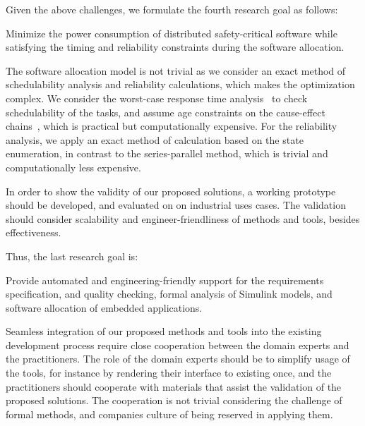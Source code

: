 Given the above challenges, we formulate the fourth research goal as follows:
\begin{researchgoal}
 Minimize the power consumption of distributed safety-critical software while satisfying the timing and reliability constraints during the software allocation.
\end{researchgoal}

The software allocation model is not trivial as we consider an exact method of schedulability analysis and reliability calculations, which makes the optimization complex. We consider the worst-case response time analysis~\cite{Baruah2011Response-timeSystems}\cite{Davis2007ControllerRevised} to check schedulability of the tasks, and assume age constraints on the cause-effect chains~\cite{mubeen2013support}, which is practical but computationally expensive. For the reliability analysis, we apply an exact method of calculation based on the state enumeration, in contrast to the series-parallel method, which is trivial and computationally less expensive. 

In order to show the validity of our proposed solutions, a working prototype should be developed, and evaluated on on industrial uses cases. The validation should consider scalability and engineer-friendliness of methods and tools, besides effectiveness. 

Thus, the last research goal is:
\begin{researchgoal}
 Provide automated and engineering-friendly support for the requirements specification, and quality checking, formal analysis of Simulink models, and software allocation of embedded applications. 
\end{researchgoal}

Seamless integration of our proposed methods and tools into the existing development process require close cooperation between the domain experts and the practitioners. The role of the domain experts should be to simplify usage of the tools, for instance by rendering their interface to existing once, and the practitioners should cooperate with materials that assist the validation of the proposed solutions. The cooperation is not trivial considering the challenge of formal methods, and companies culture of being reserved in applying them. 
